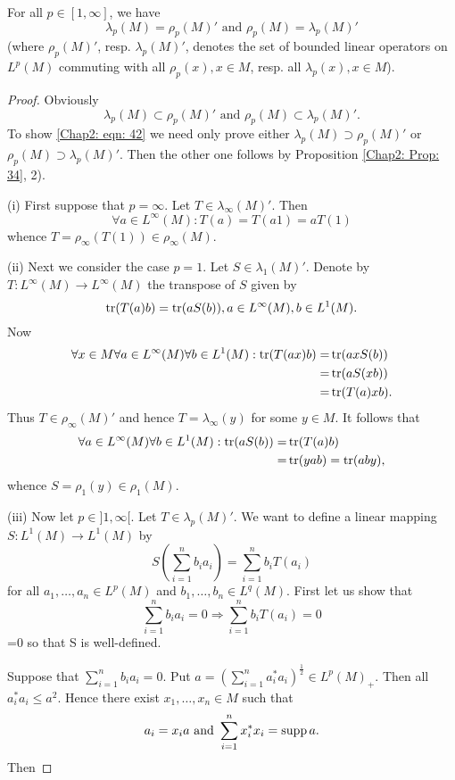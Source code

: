 \begin{proposition}
    For all $p\in [1,\infty]$, we have
    \begin{equation}\label{Chap2: eqn: 42}
        \lambda_p(M)=\rho_p(M)' \text{ and } \rho_p(M)=\lambda_p(M)'
    \end{equation}
    (where $\rho_p(M)'$, resp. $\lambda_p(M)'$, denotes the set of bounded linear operators on $L^p(M)$ commuting with all $\rho_p(x),x\in M$, resp. all $\lambda_p(x), x\in M$).
\end{proposition}
\begin{proof}
    Obviously
    \[
        \lambda_p(M)\subset \rho_p(M)' \text{ and } \rho_p(M)\subset \lambda_p(M)'.
    \]
    To show \eqref{Chap2: eqn: 42} we need only prove either $\lambda_p(M)\supset \rho_p(M)'$ or $\rho_p(M)\supset \lambda_p(M)'$. Then the other one follows by Proposition \ref{Chap2: Prop: 34}, 2).\par
    (i) First suppose that $p=\infty$. Let $T\in \lambda_\infty(M)'$. Then
    \[
        \forall a\in L^\infty(M): T(a)=T(a1)=aT(1)
    \]
    whence $T=\rho_\infty(T(1))\in \rho_\infty(M)$.\par
    (ii) Next we consider the case $p = 1$. Let $S\in \lambda_1(M)'$. Denote by $T:L^\infty(M)\to L^\infty(M)$ the transpose of $S$ given by
    \[
        \tr(T(a)b)=\tr(aS(b)),a\in L^\infty(M),b\in L^1(M).
    \]
    Now
    \[
        \begin{split}
            \forall x\in M \forall a\in L^\infty(M)\forall b\in L^1(M): \tr(T(ax)b)=&\tr(axS(b))\\
            =&\tr(aS(xb))\\
            =&\tr(T(a)xb).
        \end{split}
    \]
    Thus $T\in \rho_\infty(M)'$ and hence $T=\lambda_\infty(y)$ for some $y\in M$. It follows that
    \[
        \begin{split}
            \forall a\in L^\infty(M) \forall b\in L^1(M):\tr(aS(b))=&\tr(T(a)b)\\
            =&\tr(yab)=\tr(aby),
        \end{split}
    \]
    whence $S=\rho_1(y)\in \rho_1(M)$.\par
    (iii) Now let $p\in]1,\infty[$. Let $T\in \lambda_p(M)'$. We want to define a linear mapping $S:L^1(M)\to L^1(M)$ by
    \begin{equation}
        S\left( \sum_{i=1}^n b_ia_i \right)=\sum_{i=1}^nb_iT(a_i)
    \end{equation}
    for all $a_1,\dots,a_n\in L^p(M)$ and  $b_1,\dots,b_n\in L^q(M)$. First let us show that
    \begin{equation}
        \sum_{i=1}^nb_ia_i=0\Rightarrow \sum_{i=1}^nb_iT(a_i)=0
    \end{equation}
    {\color{red} =0} so that S is well-defined.\par
    Suppose that $\sum_{i=1}^nb_ia_i=0$. Put $a=\left( \sum_{i=1}^na_i^*a_i \right)^\frac{1}{2} \in L^p(M)_+$. Then all $a_i^*a_i\leq a^2$. Hence there exist $x_1,\dots,x_n\in M$ such that
    \[
        a_i=x_ia \text{ and }\sum_{i=1}^n x_i^*x_i=\operatorname{supp} a.
    \]
    Then
\end{proof}
% 